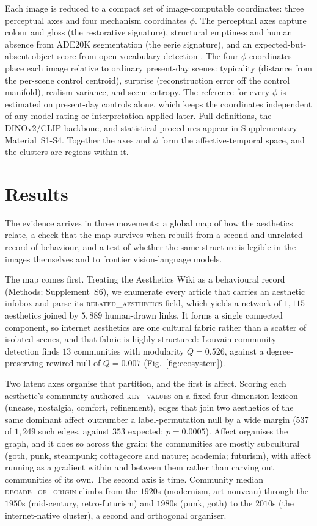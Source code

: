 \documentclass[11pt]{article}
\begin{document}
Each image is reduced to a compact set of image-computable coordinates: three perceptual axes
and four mechanism coordinates $\phi$. The perceptual axes capture colour and gloss (the
restorative signature), structural emptiness and human absence from ADE20K segmentation
\citep{xie2021} (the eerie signature), and an expected-but-absent object score from
open-vocabulary detection \citep{minderer2023}. The four $\phi$ coordinates place each image
relative to ordinary present-day scenes: typicality (distance from the per-scene control
centroid), surprise (reconstruction error off the control manifold), realism variance, and scene
entropy. The reference for every $\phi$ is estimated on present-day controls alone, which keeps
the coordinates independent of any model rating or interpretation applied later. Full definitions,
the DINOv2/CLIP backbone, and statistical procedures appear in Supplementary Material~S1-S4.
Together the axes and $\phi$ form the affective-temporal space, and the clusters are regions
within it.

\section{Results}


The evidence arrives in three movements: a global map of how the aesthetics relate, a check that
the map survives when rebuilt from a second and unrelated record of behaviour, and a test of
whether the same structure is legible in the images themselves and to frontier vision-language
models.

The map comes first. Treating the Aesthetics Wiki as a behavioural record (Methods;
Supplement~S6), we enumerate every article that carries an aesthetic infobox and parse its
\textsc{related\_aesthetics} field, which yields a network of $1{,}115$ aesthetics joined by
$5{,}889$ human-drawn links. It forms a single connected component, so internet aesthetics are one
cultural fabric rather than a scatter of isolated scenes, and that fabric is highly structured:
Louvain community detection finds $13$ communities with modularity $Q=0.526$, against a
degree-preserving rewired null of $Q=0.007$ (Fig.~\ref{fig:ecosystem}).

Two latent axes organise that partition, and the first is affect. Scoring each aesthetic's
community-authored \textsc{key\_values} on a fixed four-dimension lexicon (unease, nostalgia,
comfort, refinement), edges that join two aesthetics of the same dominant affect outnumber a
label-permutation null by a wide margin ($537$ of $1{,}249$ such edges, against $353$ expected;
$p=0.0005$). Affect organises the graph, and it does so across the grain: the communities are
mostly subcultural (goth, punk, steampunk; cottagecore and nature; academia; futurism), with
affect running as a gradient within and between them rather than carving out communities of its
own. The second axis is time. Community median \textsc{decade\_of\_origin} climbs from the $1920$s
(modernism, art nouveau) through the $1950$s (mid-century, retro-futurism) and $1980$s (punk, goth)
to the $2010$s (the internet-native cluster), a second and orthogonal organiser.
\end{document}
